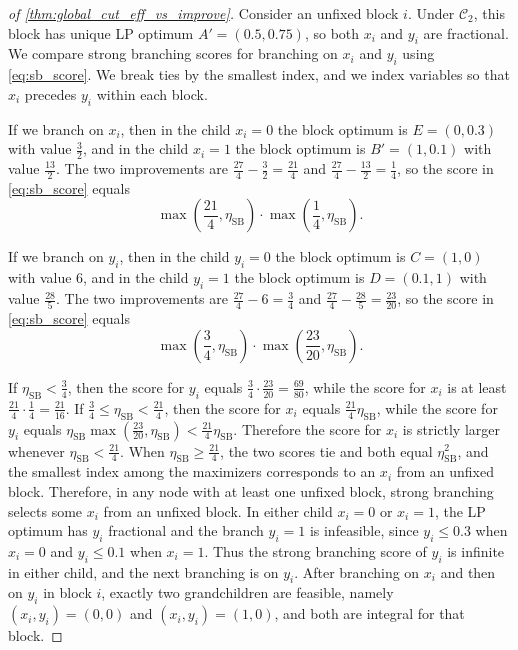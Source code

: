 \documentclass[smallextended,envcountsect]{svjour3} %
\newcommand{\Ccal}{\mathcal{C}}
\newcommand{\0}{\mathbf{0}}
\newcommand{\1}{\mathbf{1}} %
\begin{document}
\begin{proof}[of \cref{thm:global_cut_eff_vs_improve}]
	Consider an unfixed block $i$.
	Under $\Ccal_2$, this block has unique LP optimum $A'=(0.5,0.75)$, so both $x_i$ and $y_i$ are fractional.
	We compare strong branching scores for branching on $x_i$ and $y_i$ using \eqref{eq:sb_score}.
	We break ties by the smallest index, and we index variables so that $x_i$ precedes $y_i$ within each block.

	If we branch on $x_i$, then in the child $x_i=0$ the block optimum is $E=(0,0.3)$ with value $\frac{3}{2}$, and in the child $x_i=1$ the block optimum is $B'=(1,0.1)$ with value $\frac{13}{2}$.
	The two improvements are $\frac{27}{4}-\frac{3}{2}=\frac{21}{4}$ and $\frac{27}{4}-\frac{13}{2}=\frac{1}{4}$, so the score in \eqref{eq:sb_score} equals
	\[
		\max\left(\frac{21}{4},\eta_{\mathrm{SB}}\right)\cdot \max\left(\frac{1}{4},\eta_{\mathrm{SB}}\right).
	\]

	If we branch on $y_i$, then in the child $y_i=0$ the block optimum is $C=(1,0)$ with value $6$, and in the child $y_i=1$ the block optimum is $D=(0.1,1)$ with value $\frac{28}{5}$.
	The two improvements are $\frac{27}{4}-6=\frac{3}{4}$ and $\frac{27}{4}-\frac{28}{5}=\frac{23}{20}$, so the score in \eqref{eq:sb_score} equals
	\[
		\max\left(\frac{3}{4},\eta_{\mathrm{SB}}\right)\cdot \max\left(\frac{23}{20},\eta_{\mathrm{SB}}\right).
	\]

	If $\eta_{\mathrm{SB}}<\frac{3}{4}$, then the score for $y_i$ equals $\frac{3}{4}\cdot\frac{23}{20}=\frac{69}{80}$, while the score for $x_i$ is at least $\frac{21}{4}\cdot\frac{1}{4}=\frac{21}{16}$.
	If $\frac{3}{4}\le \eta_{\mathrm{SB}}<\frac{21}{4}$, then the score for $x_i$ equals $\frac{21}{4}\eta_{\mathrm{SB}}$, while the score for $y_i$ equals $\eta_{\mathrm{SB}}\max\left(\frac{23}{20},\eta_{\mathrm{SB}}\right)<\frac{21}{4}\eta_{\mathrm{SB}}$.
	Therefore the score for $x_i$ is strictly larger whenever $\eta_{\mathrm{SB}}<\frac{21}{4}$.
	When $\eta_{\mathrm{SB}}\ge \frac{21}{4}$, the two scores tie and both equal $\eta_{\mathrm{SB}}^2$, and the smallest index among the maximizers corresponds to an $x_i$ from an unfixed block.
	Therefore, in any node with at least one unfixed block, strong branching selects some $x_i$ from an unfixed block.
	In either child $x_i=0$ or $x_i=1$, the LP optimum has $y_i$ fractional and the branch $y_i=1$ is infeasible, since $y_i\le 0.3$ when $x_i=0$ and $y_i\le 0.1$ when $x_i=1$.
	Thus the strong branching score of $y_i$ is infinite in either child, and the next branching is on $y_i$.
	After branching on $x_i$ and then on $y_i$ in block $i$, exactly two grandchildren are feasible, namely $(x_i,y_i)=(0,0)$ and $(x_i,y_i)=(1,0)$, and both are integral for that block.


\end{proof}
\end{document}
